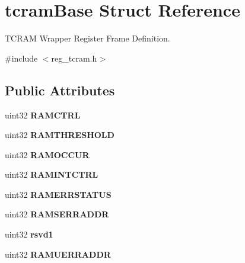 \hypertarget{structtcramBase}{}\section{tcram\+Base Struct Reference}
\label{structtcramBase}


T\+C\+R\+AM Wrapper Register Frame Definition.  




{\ttfamily \#include $<$reg\+\_\+tcram.\+h$>$}

\subsection*{Public Attributes}
\begin{DoxyCompactItemize}
\item 
\mbox{\label{structtcramBase_a9f39284c6290a44710ddda2e34473d5b}} 
uint32 {\bfseries R\+A\+M\+C\+T\+RL}
\item 
\mbox{\label{structtcramBase_a1829cf402b87047cf0a888f2d816ec1e}} 
uint32 {\bfseries R\+A\+M\+T\+H\+R\+E\+S\+H\+O\+LD}
\item 
\mbox{\label{structtcramBase_ad9fc3240f954554cde808794219a7dc2}} 
uint32 {\bfseries R\+A\+M\+O\+C\+C\+UR}
\item 
\mbox{\label{structtcramBase_a0ecf57df7799d69a4e3d7c1df73fe6ce}} 
uint32 {\bfseries R\+A\+M\+I\+N\+T\+C\+T\+RL}
\item 
\mbox{\label{structtcramBase_a9ddc8b7f8554528bf68a39d276d6dee8}} 
uint32 {\bfseries R\+A\+M\+E\+R\+R\+S\+T\+A\+T\+US}
\item 
\mbox{\label{structtcramBase_a3e40cf5210e19d5f99c15c0062bfb470}} 
uint32 {\bfseries R\+A\+M\+S\+E\+R\+R\+A\+D\+DR}
\item 
\mbox{\label{structtcramBase_acfb3d060676f8571e583f5e8a7f94629}} 
uint32 {\bfseries rsvd1}
\item 
\mbox{\label{structtcramBase_af6c40f03082773399f6f4df1f4eb285f}} 
uint32 {\bfseries R\+A\+M\+U\+E\+R\+R\+A\+D\+DR}
\item 

\end{DoxyCompactItemize}
